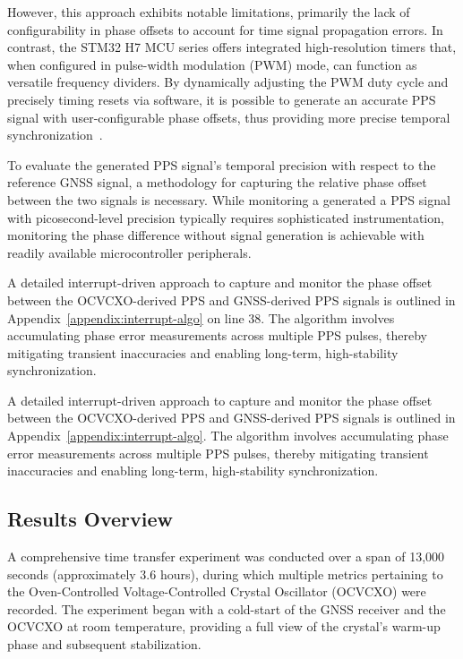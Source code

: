 \documentclass[12pt, a4paper]{extarticle}
\begin{document}
However, this approach exhibits notable limitations, primarily the lack of
configurability in phase offsets to account for time signal propagation errors.
In contrast, the STM32 H7 MCU series offers integrated high-resolution timers
that, when configured in pulse-width modulation (PWM) mode, can function as
versatile frequency dividers. By dynamically adjusting the PWM duty cycle and
precisely timing resets via software, it is possible to generate an accurate
PPS signal with user-configurable phase offsets, thus providing more precise
temporal synchronization~\cite{stm-timer}.

To evaluate the generated PPS signal's temporal precision with respect to the
reference GNSS signal, a methodology for capturing the relative phase offset
between the two signals is necessary. While monitoring a generated a PPS signal
with picosecond-level precision typically requires sophisticated
instrumentation, monitoring the phase difference without signal generation is
achievable with readily available microcontroller peripherals.

A detailed interrupt-driven approach to capture and monitor the phase offset
between the OCVCXO-derived PPS and GNSS-derived PPS signals is outlined in
Appendix~\ref{appendix:interrupt-algo} on line 38. The algorithm involves
accumulating phase error measurements across multiple PPS pulses, thereby
mitigating transient inaccuracies and enabling long-term, high-stability
synchronization.

A detailed interrupt-driven approach to capture and monitor the phase offset
between the OCVCXO-derived PPS and GNSS-derived PPS signals is outlined in
Appendix~\ref{appendix:interrupt-algo}. The algorithm involves accumulating
phase error measurements across multiple PPS pulses, thereby mitigating
transient inaccuracies and enabling long-term, high-stability synchronization.

\subsection{Results Overview}

A comprehensive time transfer experiment was conducted over a span of 13,000
seconds (approximately 3.6 hours), during which multiple metrics pertaining to
the Oven-Controlled Voltage-Controlled Crystal Oscillator (OCVCXO) were
recorded. The experiment began with a cold-start of the GNSS receiver and the
OCVCXO at room temperature, providing a full view of the crystal's warm-up
phase and subsequent stabilization.
\end{document}
